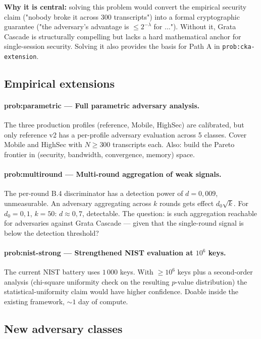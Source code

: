 \documentclass[11pt,a4paper]{article}
\begin{document}
\textbf{Why it is central:} solving this problem would convert the empirical security claim ("nobody broke it across 300 transcripts") into a formal cryptographic guarantee ("the adversary's advantage is $\leq 2^{-\lambda}$ for ..."). Without it, Grata Cascade is structurally compelling but lacks a hard mathematical anchor for single-session security. Solving it also provides the basis for Path A in \texttt{prob:cka-extension}.

\subsection{Empirical extensions}

\paragraph{prob:parametric --- Full parametric adversary analysis.} The three production profiles (reference, Mobile, HighSec) are calibrated, but only reference v2 has a per-profile adversary evaluation across 5 classes. Cover Mobile and HighSec with $N \geq 300$ transcripts each. Also: build the Pareto frontier in (security, bandwidth, convergence, memory) space.

\paragraph{prob:multiround --- Multi-round aggregation of weak signals.} The per-round B.4 discriminator has a detection power of $d = 0{,}009$, unmeasurable. An adversary aggregating across $k$ rounds gets effect $d_0 \sqrt{k}$. For $d_0 = 0{,}1$, $k = 50$: $d \approx 0{,}7$, detectable. The question: is such aggregation reachable for adversaries against Grata Cascade --- given that the single-round signal is below the detection threshold?

\paragraph{prob:nist-strong --- Strengthened NIST evaluation at $10^6$ keys.} The current NIST battery uses $1\,000$ keys. With $\geq 10^6$ keys plus a second-order analysis (chi-square uniformity check on the resulting $p$-value distribution) the statistical-uniformity claim would have higher confidence. Doable inside the existing framework, $\sim 1$ day of compute.

\subsection{New adversary classes}
\end{document}
